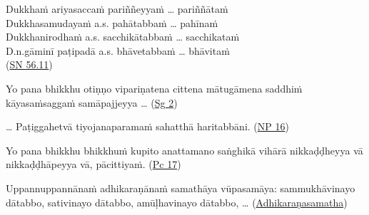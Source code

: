 \documentclass[11pt,oneside]{memoir}
\begin{document}
\begin{widecols}


Dukkhaṁ ariyasaccaṁ pariññeyyaṁ \ldots{} pariññātaṁ \\
Dukkhasamudayaṁ a.s. pahātabbaṁ \ldots{} pahīnaṁ \\
Dukkhanirodhaṁ a.s. sacchikātabbaṁ \ldots{} sacchikataṁ \\
D.n.gāminī paṭipadā a.s. bhāvetabbaṁ \ldots{} bhāvitaṁ \\
(\href{https://suttacentral.net/sn56.11/pli/ms}{SN 56.11})

\bigskip

Yo pana bhikkhu otiṇṇo vipariṇatena cittena mātugāmena saddhiṁ kāyasaṁsaggaṁ samāpajjeyya \ldots{} (\href{https://suttacentral.net/pli-tv-bu-vb-ss2/pli/ms}{Sg 2})

\bigskip

\ldots{} Paṭiggahetvā tiyojanaparamaṁ sahatthā haritabbāni. (\href{https://suttacentral.net/pli-tv-bu-vb-np16/pli/ms}{NP 16})

\columnbreak

Yo pana bhikkhu bhikkhuṁ kupito anattamano saṅghikā vihārā nikkaḍḍheyya vā nikkaḍḍhāpeyya vā, pācittiyaṁ. (\href{https://suttacentral.net/pli-tv-bu-vb-pc17/pli/ms}{Pc 17})

\bigskip

Uppannuppannānaṁ adhikaraṇānaṁ samathāya vūpasamāya: sammukhāvinayo dātabbo, sativinayo dātabbo, amūḷhavinayo dātabbo, \ldots{} (\href{https://suttacentral.net/pli-tv-bu-vb-as1-7/pli/ms}{Adhikaraṇasamatha})
\end{widecols}

\bigskip
\end{document}

